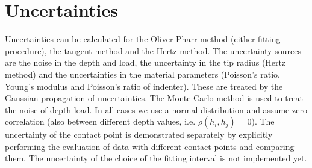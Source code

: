 %
%
\section{Uncertainties} \label{unc}
Uncertainties can be calculated for the Oliver Pharr method (either fitting procedure), the tangent method and the Hertz method. 
The uncertainty sources are the noise in the depth and load, the uncertainty in the tip radius (Hertz method) and the uncertainties in the material parameters (Poisson's ratio, Young's modulus and Poisson's ratio of indenter). 
These are treated by the Gaussian propagation of uncertainties. The Monte Carlo method is used to treat the noise of depth load. In all cases we use a normal distribution and assume zero correlation (also between different depth values, i.e. $\rho(h_i, h_j) = 0$).
The uncertainty of the contact point is demonstrated separately by explicitly performing the evaluation of data with different contact points and comparing them. 
The uncertainty of the choice of the fitting interval is not implemented yet.


